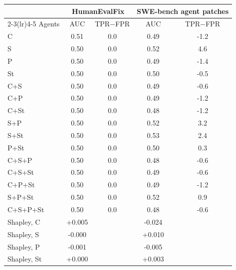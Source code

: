 \begin{tabular}{@{}l cc cc@{}}
\toprule
 & \multicolumn{2}{c}{HumanEvalFix} & \multicolumn{2}{c}{SWE-bench agent patches} \\
\cmidrule(lr){2-3}\cmidrule(lr){4-5}
Agents & AUC & TPR$-$FPR & AUC & TPR$-$FPR \\
\midrule
C & 0.51 & 0.0 & 0.49 & -1.2 \\
S & 0.50 & 0.0 & 0.52 & 4.6 \\
P & 0.50 & 0.0 & 0.49 & -1.4 \\
St & 0.50 & 0.0 & 0.50 & -0.5 \\
\midrule
C+S & 0.50 & 0.0 & 0.49 & -0.6 \\
C+P & 0.50 & 0.0 & 0.49 & -1.2 \\
C+St & 0.50 & 0.0 & 0.48 & -1.2 \\
S+P & 0.50 & 0.0 & 0.52 & 3.2 \\
S+St & 0.50 & 0.0 & 0.53 & 2.4 \\
P+St & 0.50 & 0.0 & 0.50 & 0.3 \\
\midrule
C+S+P & 0.50 & 0.0 & 0.48 & -0.6 \\
C+S+St & 0.50 & 0.0 & 0.49 & -0.6 \\
C+P+St & 0.50 & 0.0 & 0.49 & -1.2 \\
S+P+St & 0.50 & 0.0 & 0.52 & 0.9 \\
\midrule
C+S+P+St & 0.50 & 0.0 & 0.48 & -0.6 \\
\midrule
Shapley, C & +0.005 & & -0.024 & \\
Shapley, S & -0.000 & & +0.010 & \\
Shapley, P & -0.001 & & -0.005 & \\
Shapley, St & +0.000 & & +0.003 & \\
\bottomrule
\end{tabular}
